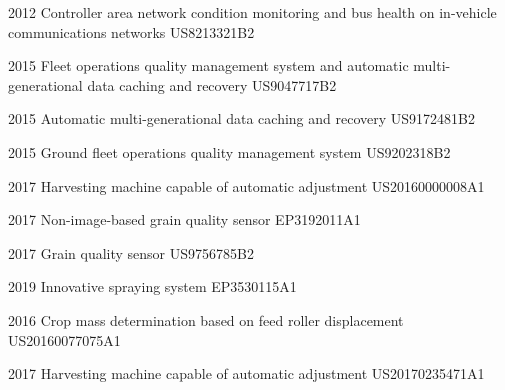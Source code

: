 

\begin{cvpatents}

  \cvpatent
    {2012} %
    {Controller area network condition monitoring and bus health on in-vehicle communications networks} %
    {US8213321B2} %

  \cvpatent
    {2015} %
    {Fleet operations quality management system and automatic multi-generational data caching and recovery} %
    {US9047717B2} %

  \cvpatent
    {2015} %
    {Automatic multi-generational data caching and recovery} %
    {US9172481B2} %

  \cvpatent
    {2015} %
    {Ground fleet operations quality management system} %
    {US9202318B2} %

  \cvpatent
    {2017} %
    {Harvesting machine capable of automatic adjustment} %
    {US20160000008A1} %

  \cvpatent
    {2017} %
    {Non-image-based grain quality sensor} %
    {EP3192011A1} %

  \cvpatent
    {2017} %
    {Grain quality sensor} %
    {US9756785B2} %

  \cvpatent
    {2019} %
    {Innovative spraying system} %
    {EP3530115A1} %

  \cvpatent
    {2016} %
    {Crop mass determination based on feed roller displacement} %
    {US20160077075A1} %

  \cvpatent
    {2017} %
    {Harvesting machine capable of automatic adjustment} %
    {US20170235471A1} %


\end{cvpatents}
